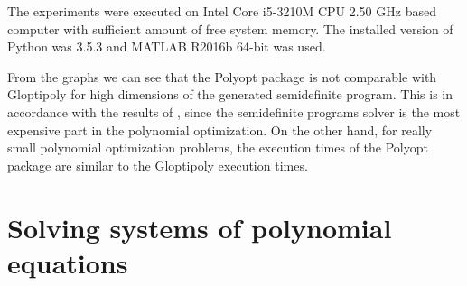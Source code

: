The experiments were executed on Intel Core i5-3210M CPU 2.50 GHz based computer with sufficient amount of free system memory.
The installed version of Python was 3.5.3 and MATLAB R2016b 64-bit was used.

From the graphs we can see that the Polyopt package is not comparable with Gloptipoly for high dimensions of the generated semidefinite program. This is in accordance with the results of , since the semidefinite programs solver is the most expensive part in the polynomial optimization.
On the other hand, for really small polynomial optimization problems, the execution times of the Polyopt package are  similar to the Gloptipoly execution times.


\section{Solving systems of polynomial equations}
